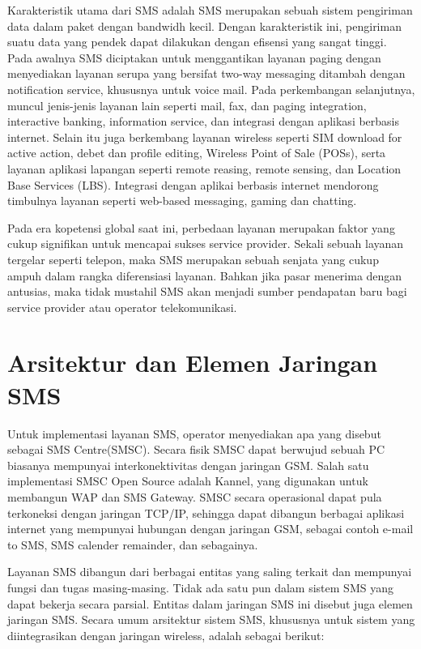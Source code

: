 \documentclass{jtetiproposalskripsi}
\begin{document}
Karakteristik utama dari SMS adalah SMS merupakan sebuah sistem pengiriman data dalam paket dengan bandwidh kecil. Dengan karakteristik ini, pengiriman suatu data yang pendek dapat dilakukan dengan efisensi yang sangat tinggi. Pada awalnya SMS diciptakan untuk menggantikan layanan paging dengan menyediakan layanan serupa yang bersifat two-way messaging ditambah dengan notification service, khususnya untuk voice mail. Pada perkembangan selanjutnya, muncul jenis-jenis layanan lain seperti mail, fax, dan paging integration, interactive banking, information service, dan integrasi dengan aplikasi berbasis internet. Selain itu juga berkembang layanan wireless seperti SIM download for active action, debet dan profile editing, Wireless Point of Sale (POSs), serta layanan aplikasi lapangan seperti remote reasing, remote sensing, dan Location Base Services (LBS). Integrasi dengan aplikai berbasis internet mendorong timbulnya layanan seperti web-based messaging, gaming dan chatting.
	
Pada era kopetensi global saat ini, perbedaan layanan merupakan faktor yang cukup signifikan untuk mencapai sukses service provider. Sekali sebuah layanan tergelar seperti telepon, maka  SMS merupakan sebuah senjata yang cukup ampuh dalam rangka diferensiasi layanan. Bahkan jika pasar menerima dengan antusias, maka tidak mustahil SMS akan menjadi sumber pendapatan baru bagi service provider atau operator telekomunikasi.
	
\section{Arsitektur dan Elemen Jaringan SMS}
Untuk implementasi layanan SMS, operator menyediakan apa yang disebut sebagai SMS Centre(SMSC). Secara fisik SMSC dapat berwujud sebuah PC biasanya mempunyai interkonektivitas  dengan jaringan GSM. Salah satu implementasi SMSC Open Source adalah Kannel, yang digunakan untuk membangun WAP dan SMS Gateway. SMSC secara operasional dapat pula terkoneksi dengan jaringan TCP/IP, sehingga dapat dibangun berbagai aplikasi internet  yang mempunyai hubungan dengan jaringan GSM, sebagai contoh e-mail to SMS, SMS calender remainder, dan sebagainya. 

Layanan SMS dibangun dari berbagai entitas yang saling terkait dan mempunyai fungsi dan tugas masing-masing. Tidak ada satu pun dalam sistem SMS yang dapat bekerja secara parsial. Entitas dalam jaringan SMS ini disebut juga elemen jaringan SMS. Secara umum arsitektur sistem SMS, khususnya untuk sistem yang diintegrasikan dengan jaringan wireless, adalah sebagai berikut: 
\end{document}
